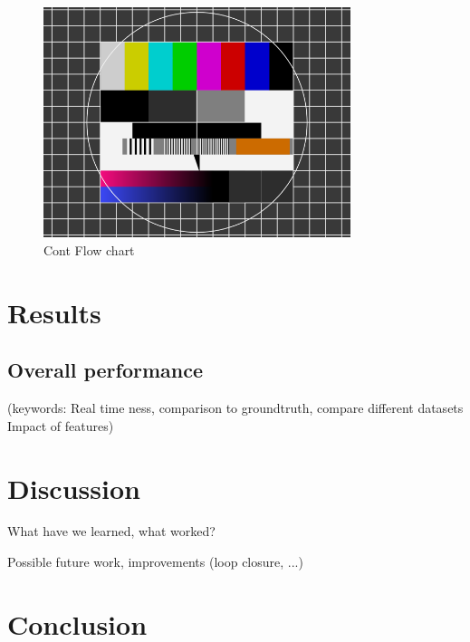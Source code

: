 \documentclass[a4paper,10pt]{article} %
\begin{document}
\begin{figure}[ht]
	\includegraphics[width=0.8\textwidth]{test}
	\caption{Cont Flow chart}
	\label{img_flow_cont}
\end{figure}


\newpage
\section{Results}

\subsection{Overall performance}
(keywords: Real time ness, comparison to groundtruth, compare different datasets
Impact of features)

\section{Discussion}
What have we learned, what worked?

Possible future work, improvements (loop closure, ...)

\section{Conclusion}


\newpage
%
\end{document}
